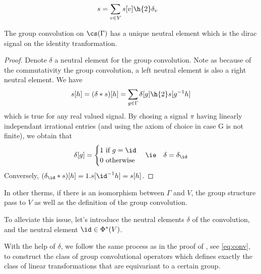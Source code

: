 \begin{align*}
s & = \displaystyle \sum_{v \in V} s[v] \h{2} \delta_v
\end{align*}







\begin{proposition} The group convolution on $\cs(\Gamma)$ has a unique neutral element which is the dirac signal on the identity tranformation.
\end{proposition}
\begin{proof}
Denote $\delta$ a neutral element for the group convolution. Note as because of the commutativity the group convolution, a left neutral element is also a right neutral element. We have $$s[h] = (\delta \ast s)[h] = \displaystyle \sum_{g \in \Gamma} \delta[g] \h{2} s[g^{-1}h]$$ which is true for any real valued signal. By chosing a signal $\pi$ having linearly independant irrational entries (and using the axiom of choice in case G is not finite), we obtain that $$\delta[g] = \begin{cases} 1 \text{ if } g = \id\\ 0 \text{ otherwise}\end{cases} \ie \quad \delta = \delta_{\id}$$
Conversely, $(\delta_{\id} \ast s)[h] = 1 . s[{\id}^{-1}h] = s[h]$.
\end{proof}











In other therms, if there is an isomorphism between $\Gamma$ and $V$, the group structure pass to $V$ as well as the definition of the group convolution.






To alleviate this issue, let's introduce the neutral elements $\delta$ of the convolution, and the neutral element $\id \in \Phi^*(V)$.


With the help of $\delta$, we follow the same process as in the proof of , see \eqref{eq:conv}, to construct the class of group convolutional operators which defines exactly the class of linear transformations that are equivariant to a certain group.






